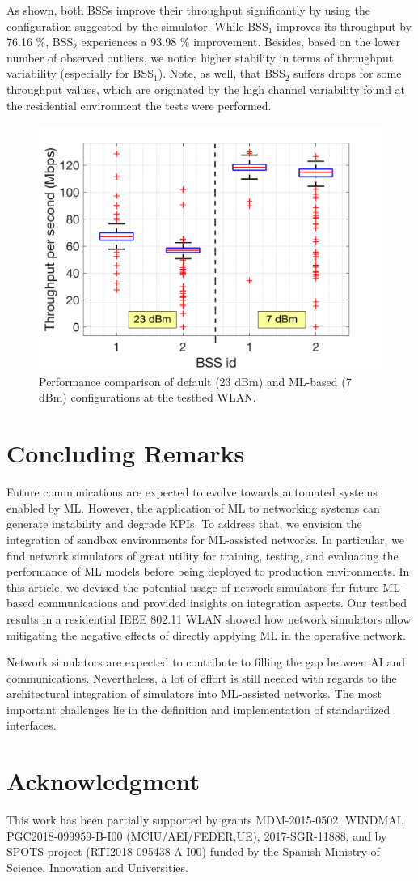 \documentclass{article}
\begin{document}
	As shown, both BSSs improve their throughput significantly by using the configuration suggested by the simulator. While BSS$_1$ improves its throughput by 76.16 \%, BSS$_2$ experiences a 93.98 \% improvement. Besides, based on the lower number of observed outliers, we notice higher stability in terms of throughput variability (especially for BSS$_1$). Note, as well, that BSS$_2$ suffers drops for some throughput values, which are originated by the high channel variability found at the residential environment the tests were performed.
	\begin{figure}[ht!!!!]
		\centering
		\includegraphics[width=0.6\columnwidth]{boxplotbps.png}
		\caption{Performance comparison of default (23 dBm) and ML-based (7 dBm) configurations at the testbed WLAN.}
		\label{fig:results}
	\end{figure}
	
	\section{Concluding Remarks}
	Future communications are expected to evolve towards automated systems enabled by ML. However, the application of ML to networking systems can generate instability and degrade KPIs. To address that, we envision the integration of sandbox environments for ML-assisted networks. In particular, we find network simulators of great utility for training, testing, and evaluating the performance of ML models before being deployed to production environments. In this article, we devised the potential usage of network simulators for future ML-based communications and provided insights on integration aspects. Our testbed results in a residential IEEE 802.11 WLAN showed how network simulators allow mitigating the negative effects of directly applying ML in the operative network.
	
	Network simulators are expected to contribute to filling the gap between AI and communications. Nevertheless, a lot of effort is still needed with regards to the architectural integration of simulators into ML-assisted networks. The most important challenges lie in the definition and implementation of standardized interfaces.

	\section*{Acknowledgment}
	This work has been partially supported by grants MDM-2015-0502, WINDMAL PGC2018-099959-B-I00 (MCIU/AEI/FEDER,UE), 2017-SGR-11888, and by SPOTS project (RTI2018-095438-A-I00) funded by the Spanish Ministry of Science, Innovation and Universities.
	
	
	
	
\end{document}
